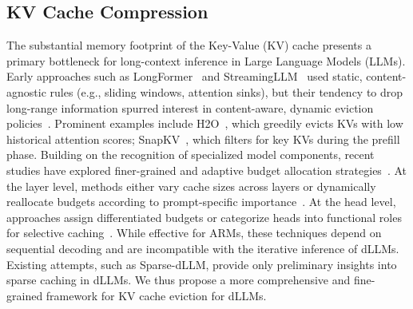 \subsection{KV Cache Compression}
The substantial memory footprint of the Key-Value (KV) cache presents a primary bottleneck for long-context inference in Large Language Models (LLMs). 
Early approaches such as LongFormer~\citep{beltagy2020longformer} and StreamingLLM~\citep{xiao2023efficient} used static, content-agnostic rules (e.g., sliding windows, attention sinks), but their tendency to drop long-range information spurred interest in content-aware, dynamic eviction policies~\citep{zhang2023h2o, li2024snapkv, devoto2024simple}. 
Prominent examples include H2O~\citep{zhang2023h2o}, which greedily evicts KVs with low historical attention scores; SnapKV~\citep{li2024snapkv}, which filters for key KVs during the prefill phase.
Building on the recognition of specialized model components, recent studies have explored finer-grained and adaptive budget allocation strategies~\citep{cai2024pyramidkv,wang2024squeezeattention,feng2024ada,xiao2024duoattention}. 
At the layer level, methods either vary cache sizes across layers or dynamically reallocate budgets according to prompt-specific importance~\citep{cai2024pyramidkv,wang2024squeezeattention}. 
At the head level, approaches assign differentiated budgets or categorize heads into functional roles for selective caching~\citep{feng2024ada,xiao2024duoattention}. 
While effective for ARMs, these techniques depend on sequential decoding and are incompatible with the iterative inference of dLLMs. 
Existing attempts, such as Sparse-dLLM, provide only preliminary insights into sparse caching in dLLMs. 
We thus propose a more comprehensive and fine-grained framework for KV cache eviction for dLLMs.
